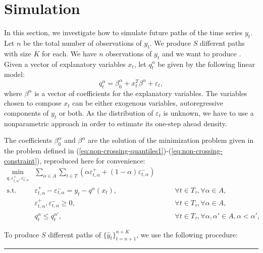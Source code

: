 \section{Simulation}
\label{sec:simulation}

In this section, we investigate how to simulate future paths of the time series $y_t$. 
Let $n$ be the total number of observations of $y_t$. We produce $S$ different paths with size $K$ for each. 
We have $n$ observations of $y_t$ and we want to produce . Given a vector of explanatory variables $x_t$, let $q_t^\alpha$ be given by the following linear model:
\begin{equation}
q_t^\alpha = \beta_0^\alpha +  x_t^T \beta^\alpha + \varepsilon_t,
\label{eq:fun-quantile}
\end{equation}
where $\beta^\alpha$ is a vector of coefficients for the explanatory variables. The variables chosen to compose $x_t$ can be either exogenous variables, autoregressive components of $y_t$ or both. As the distribution of $\varepsilon_t$ is unknown, we have to use a nonparametric approach in order to estimate its one-step ahead density.

The coefficients $\beta_0^\alpha$ and $\beta^\alpha$ are the solution of the minimization problem given in the problem defined in (\ref{eq:non-crossing-quantiles1})-(\ref{eq:non-crossing-constraint}), reproduced here for convenience:
\begin{eqnarray}
\label{eq:non-crossing-quantiles1-sim}
\min_{q,\varepsilon_{t,\alpha}^{+}, \varepsilon_{t,\alpha}^{-}} &  \sum_{\alpha \in A} \sum_{t \in T}\left(\alpha \varepsilon_{t,\alpha}^{+}+(1-\alpha)\varepsilon_{t,\alpha}^{-}\right) &  \\
\mbox{s.t. } & \varepsilon_{t,\alpha}^{+}-\varepsilon_{t,\alpha}^{-}=y_{t}-q^\alpha(x_{t}), & \qquad\forall t \in T_\tau,\forall \alpha \in A,\\
& \varepsilon_{t,\alpha}^+,\varepsilon_{t,\alpha}^- \geq 0, & \qquad\forall t \in T_\tau,\forall \alpha \in A,\\\label{eq:non-crossing-constraint-sim}
& q_t^{\alpha} \leq q_t^{\alpha'}, & \qquad \forall t \in T_\tau, \forall \alpha, \alpha' \in A, \alpha < \alpha', 
\end{eqnarray}

To produce $S$ different paths of $\{ \hat{y}_t \}_{t=n+1}^{n+K}$, we use the following procedure:

\noindent\rule{\textwidth}{3pt}

